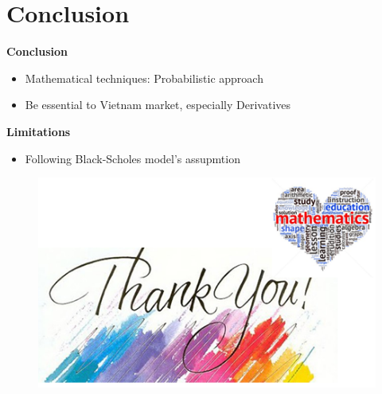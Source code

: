 \documentclass{beamer}
\begin{document}
\section{Conclusion}
\begin{frame}

{\color{red} \bfseries {Conclusion}}
\begin{itemize}
	\item Mathematical techniques: Probabilistic approach\\[0.2cm]
	\item Be essential to Vietnam market, especially Derivatives 
\end{itemize} 

\vspace{0.5cm}
{\color{red} \bfseries {Limitations}}
\begin{itemize}
	\item Following Black-Scholes model's assupmtion
\end{itemize}
\end{frame}
\begin{frame}
	\begin{figure}[htp]
		\begin{center}
			\includegraphics[scale=0.8]{fig11}
		\end{center}
	\end{figure}
\end{frame}
\end{document}
